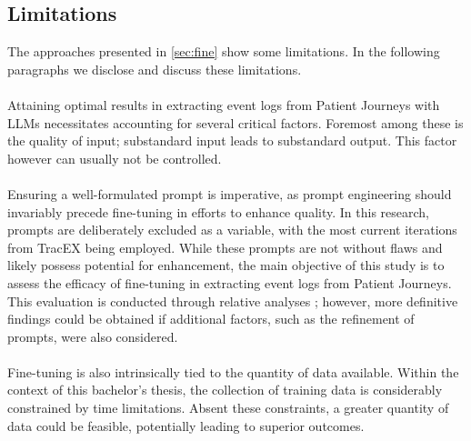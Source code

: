 \subsection{Limitations}\label{sec:limitations}
The approaches presented in \autoref{sec:fine} show some limitations. In the following paragraphs we disclose and discuss these limitations.\\\\
Attaining optimal results in extracting event logs from Patient Journeys with LLMs necessitates accounting for several critical factors. Foremost among these is the quality of input; substandard input leads to substandard output. This factor however can usually not be controlled.\\\\
Ensuring a well-formulated prompt is imperative, as prompt engineering should invariably precede fine-tuning in efforts to enhance quality.
In this research, prompts are deliberately excluded as a variable, with the most current iterations from TracEX being employed. While these prompts are not without flaws and likely possess potential for enhancement, the main objective of this study is to assess the efficacy of fine-tuning in extracting event logs from Patient Journeys. This evaluation is conducted through relative analyses ; however, more definitive findings could be obtained if additional factors, such as the refinement of prompts, were also considered.\\\\
Fine-tuning is also intrinsically tied to the quantity of data available. Within the context of this bachelor’s thesis, the collection of training data is considerably constrained by time limitations. Absent these constraints, a greater quantity of data could be feasible, potentially leading to superior outcomes.\\\\


